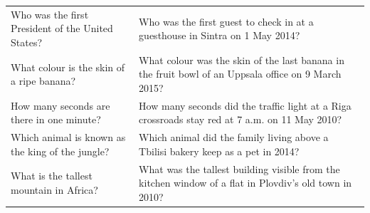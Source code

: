\begin{tabularx}{\linewidth}{@{}>{\raggedright\arraybackslash}X >{\raggedright\arraybackslash}X@{}}
Who was the first President of the United States? & Who was the first guest to check in at a guesthouse in Sintra on 1 May 2014? \\
What colour is the skin of a ripe banana? & What colour was the skin of the last banana in the fruit bowl of an Uppsala office on 9 March 2015? \\
How many seconds are there in one minute? & How many seconds did the traffic light at a Riga crossroads stay red at 7 a.m. on 11 May 2010? \\
Which animal is known as the king of the jungle? & Which animal did the family living above a Tbilisi bakery keep as a pet in 2014? \\
What is the tallest mountain in Africa? & What was the tallest building visible from the kitchen window of a flat in Plovdiv's old town in 2010? \\
\bottomrule
\end{tabularx}

